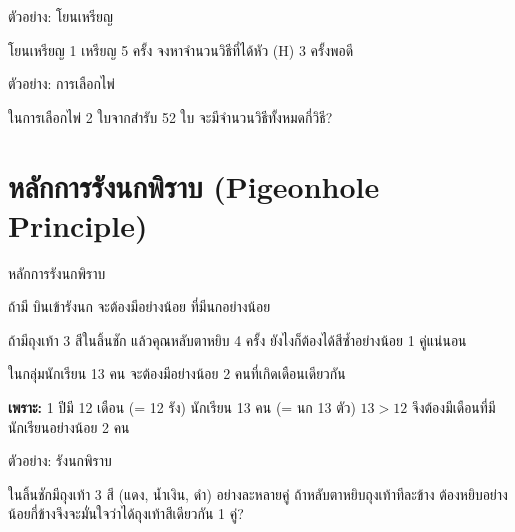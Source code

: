 \documentclass[11pt, aspectratio=169]{beamer}
\begin{document}
\begin{frame}[t]{ตัวอย่าง: โยนเหรียญ}
  \begin{exambox}[โจทย์ 2]
    โยนเหรียญ 1 เหรียญ 5 ครั้ง จงหาจำนวนวิธีที่ได้หัว (H) 3 ครั้งพอดี
  \end{exambox}

  \vspace{\fill}
\end{frame}

\begin{frame}[t]{ตัวอย่าง: การเลือกไพ่}
  \begin{exambox}[โจทย์ 3]
    ในการเลือกไพ่ 2 ใบจากสำรับ 52 ใบ จะมีจำนวนวิธีทั้งหมดกี่วิธี?
  \end{exambox}

  \vspace{\fill}
\end{frame}

\section{หลักการรังนกพิราบ (Pigeonhole Principle)}

\begin{frame}{หลักการรังนกพิราบ}
  \begin{explanation}[หลักการ]
    ถ้ามี  บินเข้ารังนก 
    จะต้องมีอย่างน้อย  ที่มีนกอย่างน้อย 
  \end{explanation}

  \begin{intuition}[คิดแบบบ้าน ๆ]
    ถ้ามีถุงเท้า 3 สีในลิ้นชัก แล้วคุณหลับตาหยิบ 4 ครั้ง
    ยังไงก็ต้องได้สีซํ้าอย่างน้อย 1 คู่แน่นอน
  \end{intuition}

  \begin{exambox}
    ในกลุ่มนักเรียน 13 คน
    จะต้องมีอย่างน้อย 2 คนที่เกิดเดือนเดียวกัน

    \textbf{เพราะ:} 1 ปีมี 12 เดือน (= 12 รัง) นักเรียน 13 คน (= นก 13 ตัว)
    $13 > 12$ จึงต้องมีเดือนที่มีนักเรียนอย่างน้อย 2 คน
  \end{exambox}
\end{frame}

\begin{frame}[t]{ตัวอย่าง: รังนกพิราบ}
  \begin{exambox}[โจทย์ 1]
    ในลิ้นชักมีถุงเท้า 3 สี (แดง, นํ้าเงิน, ดำ)
    อย่างละหลายคู่ ถ้าหลับตาหยิบถุงเท้าทีละข้าง
    ต้องหยิบอย่างน้อยกี่ข้างจึงจะมั่นใจว่าได้ถุงเท้าสีเดียวกัน 1 คู่?
  \end{exambox}

  \vspace{\fill}
\end{frame}
\end{document}
